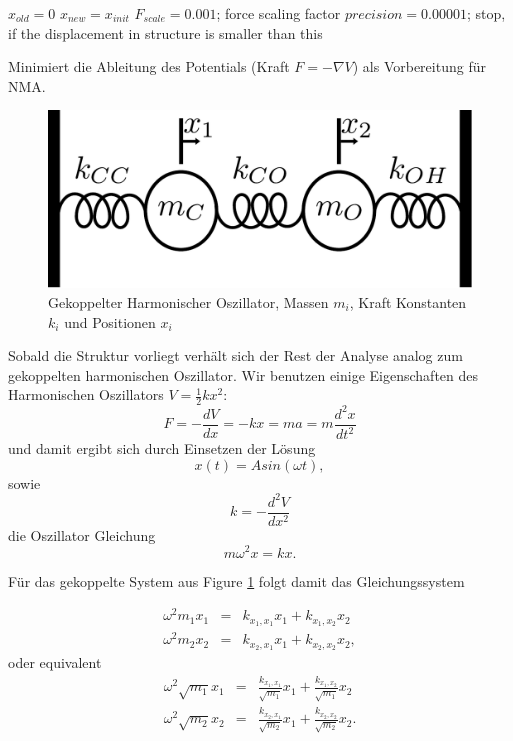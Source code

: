 \documentclass[a4paper,12pt]{article}
\begin{document}
\begin{algorithm}[H]
 \SetAlgoLined
 $x_{old} = 0$\;
 $x_{new} = x_{init}$\;
 $F_{scale} = 0.001$;  force scaling factor\;
 $precision = 0.00001$; stop, if the displacement in structure is smaller than this\;	
 \caption{Minimiert die Ableitung des Potentials (Kraft $F=-\nabla V$) als Vorbereitung für NMA. }
\end{algorithm}
\begin{figure}[ht!]
 \centering
 \includegraphics[scale=0.5,keepaspectratio=true]{./nma.pdf}
 \caption{Gekoppelter Harmonischer Oszillator, Massen $m_i$, Kraft Konstanten $k_i$ und Positionen $x_i$}
 \label{fig:hos}
\end{figure}
Sobald die Struktur vorliegt verhält sich der Rest der Analyse analog zum gekoppelten harmonischen Oszillator.
Wir benutzen einige Eigenschaften des Harmonischen Oszillators $V=\frac{1}{2}kx^2$:
\begin{equation}
 F=-\frac{dV}{dx}=-kx=ma=m\frac{d^2x}{dt^2}
\end{equation}
und damit ergibt sich durch Einsetzen der Lösung
\begin{equation}
 x(t)=Asin(\omega t),
\end{equation}
sowie
\begin{equation}
 k=-\frac{d^2V}{dx^2}
\end{equation}
die Oszillator Gleichung
\begin{equation}
 m \omega^2 x = k x.
\end{equation}

Für das gekoppelte System aus Figure \ref{fig:hos} folgt damit das Gleichungssystem

\begin{eqnarray}
 \omega^2 m_1 x_1 &=& k_{x_1,x_1} x_1 +k_{x_1,x_2} x_2\\
 \omega^2 m_2 x_2 &=& k_{x_2,x_1} x_1 +k_{x_2,x_2} x_2,
\end{eqnarray}
oder equivalent 
\begin{eqnarray}
 \omega^2 \sqrt{m_1} x_1 &=& \frac{ k_{x_1,x_1} }{ \sqrt{m_1} } x_1 +\frac{ k_{x_1,x_2} }{ \sqrt{m_1} } x_2\\
 \omega^2 \sqrt{m_2} x_2 &=& \frac{ k_{x_2,x_1} }{ \sqrt{m_2} } x_1 +\frac{ k_{x_2,x_2} }{ \sqrt{m_2} } x_2.
\end{eqnarray}
\end{document}
